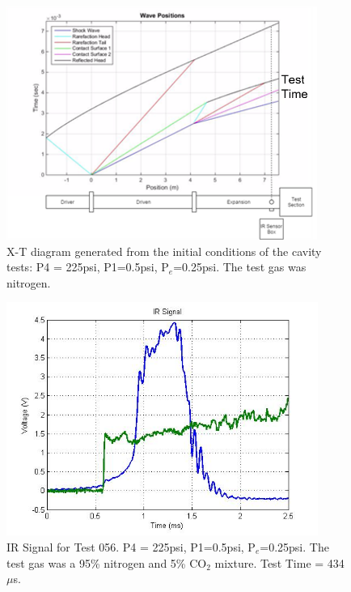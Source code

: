 \begin{figure}
\centering
\includegraphics[height = 3in]{Figures/XTDiag.png}
\caption[X-T Diagram of Cavity Tests]{X-T diagram generated from the initial conditions of the cavity tests: P4 = 225psi, P1=0.5psi, P$_e$=0.25psi. The test gas was nitrogen.}
\label{fig:XT}
\end{figure}

\begin{figure}
\centering
\includegraphics[height = 3in]{Figures/CO2-2.jpg}
\caption[IR Signal for Test 046]{IR Signal for Test 056. P4 = 225psi, P1=0.5psi, P$_e$=0.25psi. The test gas was a 95\% nitrogen and 5\% CO$_2$ mixture. Test Time = 434 $\mu$s.}
\label{fig:IRTrace}
\end{figure}

